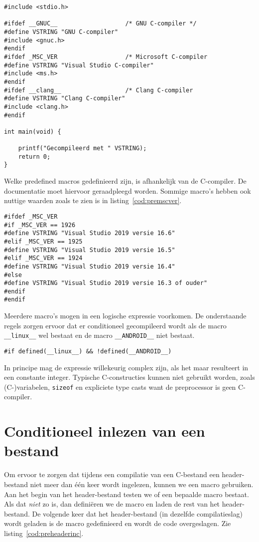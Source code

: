 \begin{lstlisting}[caption=Conditioneel inlezen van header-bestanden.,label=cod:precondinc]
#include <stdio.h>

#ifdef __GNUC__                   /* GNU C-compiler */
#define VSTRING "GNU C-compiler"
#include <gnuc.h>
#endif
#ifdef _MSC_VER                   /* Microsoft C-compiler
#define VSTRING "Visual Studio C-compiler"
#include <ms.h>
#endif
#ifdef __clang__                  /* Clang C-compiler
#define VSTRING "Clang C-compiler"
#include <clang.h>
#endif

int main(void) {

	printf("Gecompileerd met " VSTRING);
	return 0;
}

\end{lstlisting}

Welke predefined macros gedefinieerd zijn, is afhankelijk van de C-compiler. De documentatie moet hiervoor geraadpleegd worden. Sommige macro's hebben ook nuttige waarden zoals te zien is in listing~\ref{cod:premscver}.

\begin{lstlisting}[caption=Gebruik van de \texttt{\_MSC\_VER}-macro.,label=cod:premscver]
#ifdef _MSC_VER
#if _MSC_VER == 1926
#define VSTRING "Visual Studio 2019 versie 16.6"
#elif _MSC_VER == 1925
#define VSTRING "Visual Studio 2019 versie 16.5"
#elif _MSC_VER == 1924
#define VSTRING "Visual Studio 2019 versie 16.4"
#else
#define VSTRING "Visual Studio 2019 versie 16.3 of ouder"
#endif
#endif
\end{lstlisting}

Meerdere macro's mogen in een logische expressie voorkomen. De onderstaande regels zorgen ervoor dat er conditioneel gecompileerd wordt als de macro \texttt{\_\_linux\_\_} wel bestaat en de macro \texttt{\_\_ANDROID\_\_} niet bestaat.

\hspace*{1em}\texttt{\#if defined(\_\_linux\_\_) \&\& !defined(\_\_ANDROID\_\_)}

In principe mag de expressie willekeurig complex zijn, als het maar resulteert in een constante integer. Typische C-constructies kunnen niet gebruikt worden, zoals (C-)variabelen, \texttt{sizeof} en expliciete type casts want de preprocessor is geen C-compiler.


\section{Conditioneel inlezen van een bestand}
\label{sec:conditioneelinlezen}
Om ervoor te zorgen dat tijdens een compilatie van een C-bestand een header-bestand niet meer dan één keer wordt ingelezen, kunnen we een macro gebruiken. Aan het begin van het header-bestand testen we of een bepaalde macro bestaat. Als dat \textsl{niet} zo is, dan definiëren we de macro en laden de rest van het header-bestand. De volgende keer dat het header-bestand (in dezelfde compilatieslag) wordt geladen is de macro gedefinieerd en wordt de code overgeslagen. Zie listing~\ref{cod:preheaderinc}.

